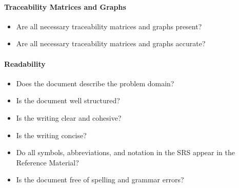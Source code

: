 \paragraph{Traceability Matrices and Graphs}
\begin{itemize}

    \item Are all necessary traceability matrices and graphs present?

    \item Are all necessary traceability matrices and graphs accurate?

\end{itemize}

\paragraph{Readability}
\begin{itemize}

    \item Does the document describe the problem domain?

    \item Is the document well structured?

    \item Is the writing clear and cohesive?

    \item Is the writing concise?

    \item Do all symbols, abbreviations, and notation in the SRS appear in the
    Reference Material?

    \item Is the document free of spelling and grammar errors?

\end{itemize}